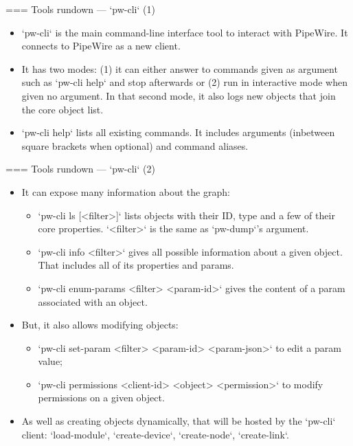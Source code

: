 === {Tools rundown — `pw-cli` (1)}
  \begin{itemize}

  \item `pw-cli` is the main command-line interface tool to
    interact with PipeWire. It connects to PipeWire as a new client.

  \item It has two modes: (1) it can either answer to commands given as
    argument such as `pw-cli help` and stop afterwards or (2) run
    in interactive mode when given no argument. In that second mode, it
    also logs new objects that join the core object list.

  \item `pw-cli help` lists all existing commands. It includes
    arguments (inbetween square brackets when optional) and command
    aliases.

  \end{itemize}




=== {Tools rundown — `pw-cli` (2)}
  \begin{itemize}

  \item It can expose many information about the graph:

    \begin{itemize}

    \item `pw-cli ls [<filter>]` lists objects with their ID,
      type and a few of their core properties. `<filter>` is the
      same as `pw-dump`'s argument.

    \item `pw-cli info <filter>` gives all possible
      information about a given object. That includes all of its
      properties and params.

    \item `pw-cli enum-params <filter> <param-id>` gives the
      content of a param associated with an object.

    \end{itemize}

  \item But, it also allows modifying objects:

    \begin{itemize}
    \item `pw-cli set-param <filter> <param-id> <param-json>` to
      edit a param value;
    \item `pw-cli permissions <client-id> <object> <permission>`
      to modify permissions on a given object.
    \end{itemize}

  \item As well as creating objects dynamically, that will be hosted by
    the `pw-cli` client: `load-module`, `create-device`,
    `create-node`, `create-link`.

  \end{itemize}




